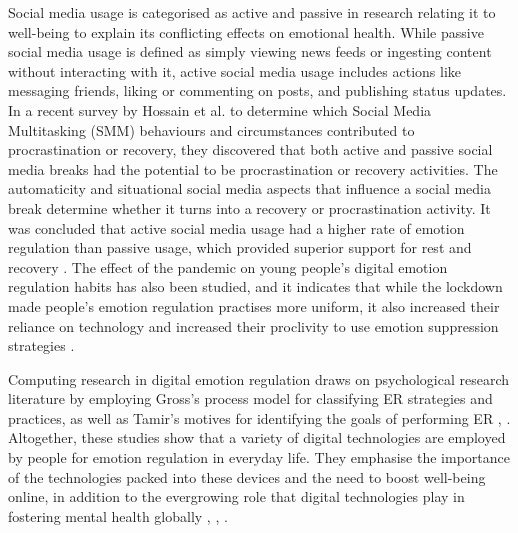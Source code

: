 \documentclass[lettersize,journal]{IEEEtran}
\begin{document}
Social media usage is categorised as active and passive in research relating it to well-being to explain its conflicting effects on emotional health. While passive social media usage is defined as simply viewing news feeds or ingesting content without interacting with it, active social media usage includes actions like messaging friends, liking or commenting on posts, and publishing status updates. In a recent survey by Hossain et al. to determine which Social Media Multitasking (SMM) behaviours and circumstances contributed to procrastination or recovery, they discovered that both active and passive social media breaks had the potential to be procrastination or recovery activities. The automaticity and situational social media aspects that influence a social media break determine whether it turns into a recovery or procrastination activity. It was concluded that active social media usage had a higher rate of emotion regulation than passive usage, which provided superior support for rest and recovery \cite{hossain2022motivational}. The effect of the pandemic on young people's digital emotion regulation habits has also been studied, and it indicates that while the lockdown made people's emotion regulation practises more uniform, it also increased their reliance on technology and increased their proclivity to use emotion suppression strategies \cite{tag2022impact}.


Computing research in digital emotion regulation draws on psychological research literature by employing Gross's process model for classifying ER strategies and practices, as well as Tamir's motives for identifying the goals of performing ER \cite{slovak2022designing}, \cite{wadley2020digital}. 
Altogether, these studies show that a variety of digital technologies are employed by people for emotion regulation in everyday life. They emphasise the importance of the technologies packed into these devices and the need to boost well-being online, in addition to the evergrowing role that digital technologies play in fostering mental health globally \cite{slovak2022designing}, \cite{wadley2020digital}, \cite{smith2022digital}.

  
  
  
  
\end{document}
